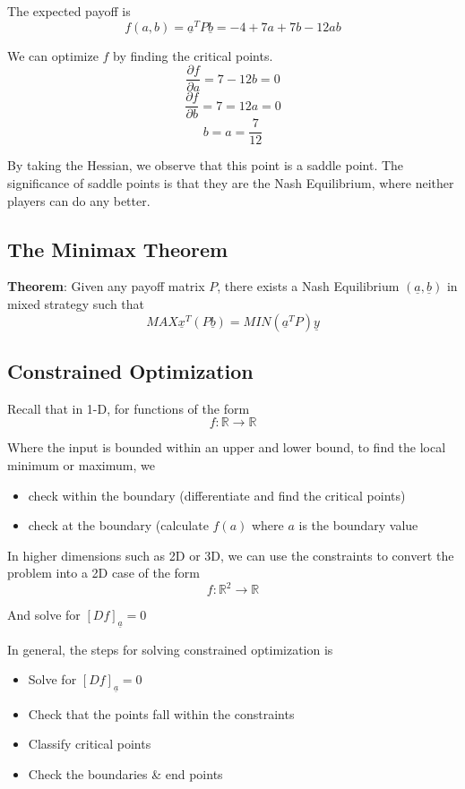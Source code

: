 The expected payoff is
\[
  f(a, b) = \underline{a}^T P \underline{b} = -4 + 7a + 7b - 12ab
\] 

We can optimize $f$ by finding the critical points.
\[
  \frac{\partial f}{\partial a} = 7 - 12b = 0
\] 
\[
  \frac{\partial f}{\partial b} = 7 = 12a = 0
\] 
\[
  b = a = \frac{7}{12}
\] 

By taking the Hessian, we observe that this point is a saddle point. The significance of saddle points is that they are the Nash Equilibrium, where neither players can do any better.

\subsection{The Minimax Theorem}

\begin{framed}
   \textbf{Theorem}: Given any payoff matrix  $P$, there exists a Nash Equilibrium $ \left(  \underline{a}, \underline{b} \right) $ in mixed strategy such that
   \[
     MAX \underline{x}^T (P \underline{b}) = MIN ( \underline{a}^T P) \underline{y}
   \] 
  
\end{framed}


\subsection{Constrained Optimization}

Recall that in 1-D, for functions of the form 
\[
  f: \mathbb{R} \rightarrow \mathbb{R}
\] 

Where the input is bounded within an upper and lower bound, to find the local minimum or maximum, we 
\begin{itemize}
   \item check within the boundary (differentiate and find the critical points)
   \item check at the boundary (calculate $f(a)$ where $a$ is the boundary value
      
\end{itemize}

In higher dimensions such as 2D or 3D, we can use the constraints to convert the problem into a 2D case of the form
\[
  f: \mathbb{R}^2 \rightarrow \mathbb{R}
\] 

And solve for $ \left[ D f \right]_{ \underline{a}} = 0$

In general, the steps for solving constrained optimization is
\begin{itemize}
   \item Solve for $ \left[ D f \right]_{ \underline{a}} = 0$
   \item Check that the points fall within the constraints
   \item Classify critical points
   \item Check the boundaries \& end points 
\end{itemize}


